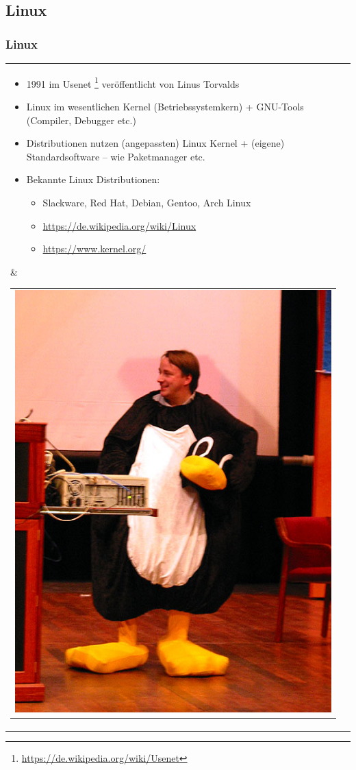 \documentclass[xcolor=dvipsnames,aspectratio=169]{beamer}
\begin{document}
\subsection{Linux}

\begin{frame}
	\frametitle{Linux}
 \begin{tabular}{lc}
\hspace{-1.3cm}
 \parbox{0.65\linewidth}{
 \vspace{-1cm}
\begin{itemize}
	\item 1991 im Usenet \footnote{\url{https://de.wikipedia.org/wiki/Usenet}} veröffentlicht von Linus Torvalds
	\item Linux im wesentlichen Kernel (Betriebssystemkern) + GNU-Tools (Compiler, Debugger etc.)
	\item Distributionen nutzen (angepassten) Linux Kernel + (eigene) Standardsoftware -- wie Paketmanager etc.
	\item Bekannte Linux Distributionen:
	\begin{itemize}
	\item Slackware, Red Hat, Debian, Gentoo, Arch Linux
	\item \url{https://de.wikipedia.org/wiki/Linux}
	\item \url{https://www.kernel.org/}
	\end{itemize}
\end{itemize} } 
& \begin{tabular}{c}
 \hspace{-0.5cm}
           \includegraphics[scale=0.215]{linus}
           \end{tabular}
\end{tabular}
\end{frame}
\end{document}
